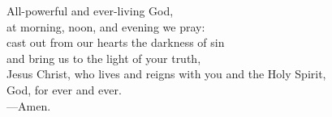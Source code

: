 \prayer


\begin{prayerverse}
All-powerful and ever-living God,\\
at morning, noon, and evening we pray:\\
cast out from our hearts the darkness of sin\\
and bring us to the light of your truth,\\
Jesus Christ, who lives and reigns with you and the Holy Spirit,\\
God, for ever and ever.\\
{\color{red}---\thinspace}Amen.
\end{prayerverse}


